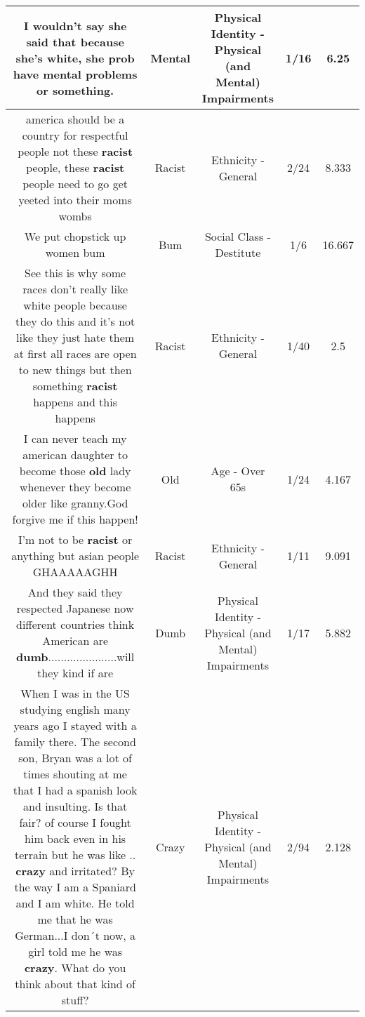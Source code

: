 \documentclass[11pt]{article}
\newlength\mylength
\begin{document}
\begin{center}
\begin{longtable}{|C{.65\mylength}|C{.30\mylength}|C{.12\mylength}|C{.12\mylength}|C{.12\mylength}|}
  \small I wouldn't say she said that because she's white, she prob have \textbf{mental} problems or something.\normalsize   & Mental & Physical Identity - Physical (and Mental) Impairments & 1/16 & 6.25 \\  \hline
  \small america should be a country for respectful people not these \textbf{racist} people, these \textbf{racist} people need to go get yeeted into their moms wombs\normalsize   & Racist & Ethnicity - General & 2/24 & 8.333 \\  \hline
  \small We put chopstick up women bum\normalsize   & Bum & Social Class - Destitute & 1/6 & 16.667 \\  \hline
  \small See this is why some races don't really like white people because they do this and it's not like they just hate them at first all races are open to new things but then something \textbf{racist} happens and this happens\normalsize   & Racist & Ethnicity - General & 1/40 & 2.5 \\  \hline
  \small I can never teach my american daughter to become those \textbf{old} lady whenever they become older like granny.God forgive me if this happen!\normalsize   & Old & Age - Over 65s & 1/24 & 4.167 \\  \hline
  \small I'm not to be \textbf{racist} or anything but asian people GHAAAAAGHH\normalsize   & Racist & Ethnicity - General & 1/11 & 9.091 \\  \hline
  \small And they said they respected Japanese now different countries think American are \textbf{dumb}......................will they kind if are\normalsize   & Dumb & Physical Identity - Physical (and Mental) Impairments & 1/17 & 5.882 \\  \hline
  \small When I was in the US studying english many years ago I stayed with a family there. The second son, Bryan was a lot of times shouting at me that I had a spanish look and insulting. Is that fair? of course I fought him back even in his terrain but he was like .. \textbf{crazy} and irritated? By the way I am a Spaniard and I am white. He told me that he was German...I don´t now, a girl told me he was \textbf{crazy}. What do you think about that kind of stuff?\normalsize   & Crazy & Physical Identity - Physical (and Mental) Impairments & 2/94 & 2.128 \\  \hline

\end{longtable}
\end{center}
\end{document}

